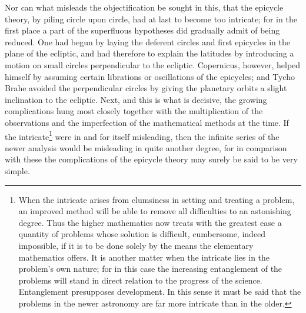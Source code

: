 \documentclass[12pt,a4paper]{book}
\begin{document}
Nor can what misleads the objectification be sought in this, that the epicycle theory, by piling circle
upon circle, had at last to become too intricate; for in the first place a part of the superfluous
hypotheses did gradually admit of being reduced. One had begun by laying the deferent circles and first
epicycles in the plane of the ecliptic, and had therefore to explain the latitudes by introducing a
motion on small circles perpendicular to the ecliptic. Copernicus, however, helped himself by assuming
certain librations or oscillations of the epicycles; and Tycho Brahe avoided the perpendicular circles by
giving the planetary orbits a slight inclination to the ecliptic. Next, and this is what is decisive, the
growing complications hung most closely together with the multiplication of the observations and the
imperfection of the mathematical methods at the time. If the intricate\footnote{%
When the intricate arises from clumsiness in setting and treating a problem, an improved method will be
able to remove all difficulties to an astonishing degree. Thus the higher mathematics now treats with the
greatest ease a quantity of problems whose solution is difficult, cumbersome, indeed impossible, if it is
to be done solely by the means the elementary mathematics offers. It is another matter when the intricate
lies in the problem's own nature; for in this case the increasing entanglement of the problems will stand
in direct relation to the progress of the science. Entanglement presupposes development. In this sense it
must be said that the problems in the newer astronomy are far more intricate than in the older.} were in
and for itself misleading, then the infinite series of the newer analysis would be misleading in quite
another degree, for in comparison with these the complications of the epicycle theory may surely be said
to be very simple.
\end{document}
